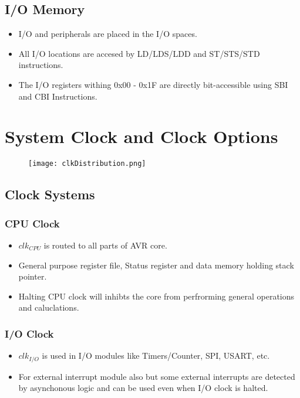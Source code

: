 \documentclass{article}
\begin{document}
\subsection{I/O Memory}
\begin{itemize}
    \item I/O and peripherals are placed in the I/O spaces.
    \item All I/O locations are accesed by LD/LDS/LDD and ST/STS/STD instructions.
    \item The I/O registers withing 0x00 - 0x1F are directly bit-accessible using SBI and CBI Instructions.
\end{itemize}


\section{System Clock and Clock Options}
\begin{figure}[H]
    \begin{center}
        \texttt{[image: clkDistribution.png]}
    \end{center}
\end{figure}

\subsection{Clock Systems}
\subsubsection{CPU Clock}
\begin{itemize}
    \item $clk_{CPU}$ is routed to all parts of AVR core.
    \item General purpose register file, Status register and data memory holding stack pointer.
    \item Halting CPU clock will inhibts the core from perfrorming general operations and caluclations.
\end{itemize}

\subsubsection{I/O Clock}
\begin{itemize}
    \item $clk_{I/O}$ is used in I/O modules like Timers/Counter, SPI, USART, etc.
    \item For external interrupt module also but some external interrupts are detected by asynchonous logic and can be used even when I/O clock is halted.
\end{itemize}
\end{document}
